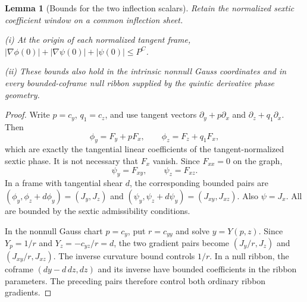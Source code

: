 \documentclass[11pt]{amsart}
\newtheorem{lemma}[theorem]{Lemma}
\theoremstyle{definition}
\theoremstyle{remark}
\numberwithin{equation}{section}
\begin{document}
\begin{lemma}[Bounds for the two inflection scalars]\label{low:6:sai:scalar-compatibility}
Retain the normalized sextic coefficient window on a common inflection sheet.

\noindent\textup{(i)} At the origin of each normalized tangent frame, $|\nabla\phi(0)|+|\nabla\psi(0)|+|\psi(0)|\le P^C$.

\noindent\textup{(ii)} These bounds also hold in the intrinsic nonnull Gauss coordinates and in every bounded-coframe null ribbon supplied by the quintic derivative phase geometry.
\end{lemma}
\begin{proof}
Write $p=c_y$, $q_1=c_z$, and use tangent vectors $\partial_y+p\partial_x$ and $\partial_z+q_1\partial_x$. Then
\[
\phi_y=F_y+pF_x,\qquad \phi_z=F_z+q_1F_x,
\]
which are exactly the tangential linear coefficients of the tangent-normalized sextic phase. It is not necessary that $F_x$ vanish. Since $F_{xx}=0$ on the graph,
\[
\psi_y=F_{xy},\qquad \psi_z=F_{xz}.
\]
In a frame with tangential shear $d$, the corresponding bounded pairs are $(\phi_y,\phi_z+d\phi_y)=(J_y,J_z)$ and $(\psi_y,\psi_z+d\psi_y)=(J_{xy},J_{xz})$. Also $\psi=J_x$. All are bounded by the sextic admissibility conditions.

In the nonnull Gauss chart $p=c_y$, put $r=c_{yy}$ and solve $y=Y(p,z)$. Since $Y_p=1/r$ and $Y_z=-c_{yz}/r=d$, the two gradient pairs become $(J_y/r,J_z)$ and $(J_{xy}/r,J_{xz})$. The inverse curvature bound controls $1/r$. In a null ribbon, the coframe $(dy-d\,dz,dz)$ and its inverse have bounded coefficients in the ribbon parameters. The preceding pairs therefore control both ordinary ribbon gradients. 
\end{proof}
\end{document}
